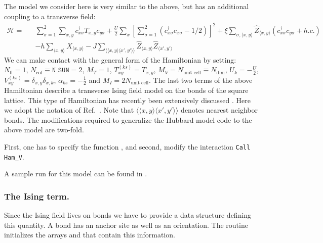 The model we consider here  is very similar to the  above,  but has an additional coupling to a transverse field: 
\begin{eqnarray}
\label{eqn_hubbard_sun_Ising}
\mathcal{H}= & & 
\sum\limits_{\sigma=1}^{2} 
\sum\limits_{x,y } 
  c^{\dagger}_{x \sigma} T_{x,y}c^{\phantom\dagger}_{y \sigma} 
+ \frac{U}{2}\sum\limits_{x}\left[
\sum\limits_{\sigma=1}^{2}
\left(  c^{\dagger}_{x \sigma} c^{\phantom\dagger}_{x \sigma}  -1/2 \right) \right]^{2}   
+  \xi \sum_{\sigma,\langle x,y \rangle} \hat{Z}_{\langle x,y \rangle}  \left( c^{\dagger}_{x \sigma} c^{\phantom\dagger}_{y \sigma}  + h.c. \right)  \nonumber \\ 
 & & - h \sum_{\langle x,y \rangle} \hat{X}_{\langle x,y \rangle}   - J \sum_{\langle \langle x,y \rangle \langle x',y' \rangle \rangle} 
  \hat{Z}_{\langle x,y \rangle}   \hat{Z}_{\langle x',y' \rangle} 
\end{eqnarray}
We can make contact with the general form of the Hamiltonian by setting: 
$N_{\mathrm{fl}} = 1$, $N_{\mathrm{col}} \equiv \texttt{N\_SUN}     =2 $,   $M_T    =    1$,  $T^{(ks)}_{x y}   =  T_{x,y}$,  $M_V   =  N_{\text{unit cell}} \equiv N_{\mathrm{dim}}$,  $U_{k}       =   -\frac{U}{2}$, 
 $V_{x y}^{(ks)} =  \delta_{x,y} \delta_{x,k}$,  $\alpha_{ks}   = - \frac{1}{2}  $ and $M_I       = 2 N_{\text{unit cell}} $.  
 The last two terms of the  above Hamiltonian describe a transverse Ising field model on the bonds of the square lattice.  This  type of Hamiltonian  has  recently been extensively discussed  \cite{Schattner15,Xu16,Assaad16}.  Here we adopt the notation of Ref.~\cite{Assaad16}. Note that   $\langle \langle x,y \rangle \langle x',y' \rangle \rangle $ denotes nearest neighbor bonds.
The modifications  required to generalize the Hubbard model code to the above model are two-fold. 

First,  one has to specify the function , and  second,  modify the interaction \texttt{Call Ham\_V}.

A sample run for this model can be found in .


\subsubsection{The Ising term.}
Since the Ising field lives on bonds we have to provide a data structure defining this quantity.  A bond has an anchor site as well as an orientation. The routine    initializes  the arrays  and   that contain this information. 


